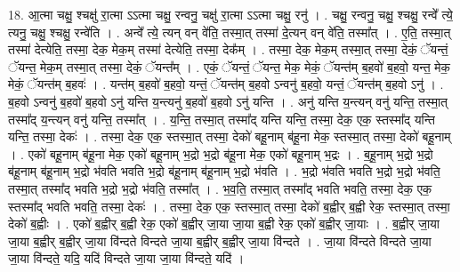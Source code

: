\documentclass[17pt]{extarticle}
\begin{document}
18. आ॒त्मा चक्षु॒ श्चक्षु॑ रा॒त्मा ऽऽत्मा चक्षु॒ रन्वनु॒ चक्षु॑ रा॒त्मा ऽऽत्मा चक्षु॒ रनु॑ । . चक्षु॒ रन्वनु॒ चक्षु॒ श्चक्षु॒ रन्वे᳚ त्ये॒ त्यनु॒ चक्षु॒ श्चक्षु॒ रन्वे॑ति । . अन्वे᳚ त्ये॒ त्यन् वन् वे॑ति॒ तस्मा॒त् तस्मा॑ दे॒त्यन् वन् वे॑ति॒ तस्मा᳚त् । . ए॒ति॒ तस्मा॒त् तस्मा॑ देत्येति॒ तस्मा॒ देक॒ मेक॒म् तस्मा॑ देत्येति॒ तस्मा॒ देक᳚म् । . तस्मा॒ देक॒ मेक॒म् तस्मा॒त् तस्मा॒ देकं॒ ॅयन्तं॒ ॅयन्त॒ मेक॒म् तस्मा॒त् तस्मा॒ देकं॒ ॅयन्त᳚म् । . एकं॒ ॅयन्तं॒ ॅयन्त॒ मेक॒ मेकं॒ ॅयन्त॑म् ब॒हवो॑ ब॒हवो॒ यन्त॒ मेक॒ मेकं॒ ॅयन्त॑म् ब॒हवः॑ । . यन्त॑म् ब॒हवो॑ ब॒हवो॒ यन्तं॒ ॅयन्त॑म् ब॒हवो ऽन्वनु॑ ब॒हवो॒ यन्तं॒ ॅयन्त॑म् ब॒हवो ऽनु॑ । . ब॒हवो ऽन्वनु॑ ब॒हवो॑ ब॒हवो ऽनु॑ यन्ति य॒न्त्यनु॑ ब॒हवो॑ ब॒हवो ऽनु॑ यन्ति । . अनु॑ यन्ति य॒न्त्यन् वनु॑ यन्ति॒ तस्मा॒त् तस्मा᳚द् य॒न्त्यन् वनु॑ यन्ति॒ तस्मा᳚त् । . य॒न्ति॒ तस्मा॒त् तस्मा᳚द् यन्ति यन्ति॒ तस्मा॒ देक॒ एक॒ स्तस्मा᳚द् यन्ति यन्ति॒ तस्मा॒ देकः॑ । . तस्मा॒ देक॒ एक॒ स्तस्मा॒त् तस्मा॒ देको॑ बहू॒नाम् ब॑हू॒ना मेक॒ स्तस्मा॒त् तस्मा॒ देको॑ बहू॒नाम् । . एको॑ बहू॒नाम् ब॑हू॒ना मेक॒ एको॑ बहू॒नाम् भ॒द्रो भ॒द्रो ब॑हू॒ना मेक॒ एको॑ बहू॒नाम् भ॒द्रः । . ब॒हू॒नाम् भ॒द्रो भ॒द्रो ब॑हू॒नाम् ब॑हू॒नाम् भ॒द्रो भ॑वति भवति भ॒द्रो ब॑हू॒नाम् ब॑हू॒नाम् भ॒द्रो भ॑वति । . भ॒द्रो भ॑वति भवति भ॒द्रो भ॒द्रो भ॑वति॒ तस्मा॒त् तस्मा᳚द् भवति भ॒द्रो भ॒द्रो भ॑वति॒ तस्मा᳚त् । . भ॒व॒ति॒ तस्मा॒त् तस्मा᳚द् भवति भवति॒ तस्मा॒ देक॒ एक॒ स्तस्मा᳚द् भवति भवति॒ तस्मा॒ देकः॑ । . तस्मा॒ देक॒ एक॒ स्तस्मा॒त् तस्मा॒ देको॑ ब॒ह्वीर् ब॒ह्वी रेक॒ स्तस्मा॒त् तस्मा॒ देको॑ ब॒ह्वीः । . एको॑ ब॒ह्वीर् ब॒ह्वी रेक॒ एको॑ ब॒ह्वीर् जा॒या जा॒या ब॒ह्वी रेक॒ एको॑ ब॒ह्वीर् जा॒याः । . ब॒ह्वीर् जा॒या जा॒या ब॒ह्वीर् ब॒ह्वीर् जा॒या वि॑न्दते विन्दते जा॒या ब॒ह्वीर् ब॒ह्वीर् जा॒या वि॑न्दते । . जा॒या वि॑न्दते विन्दते जा॒या जा॒या वि॑न्दते॒ यदि॒ यदि॑ विन्दते जा॒या जा॒या वि॑न्दते॒ यदि॑ । \newline
\end{document}
